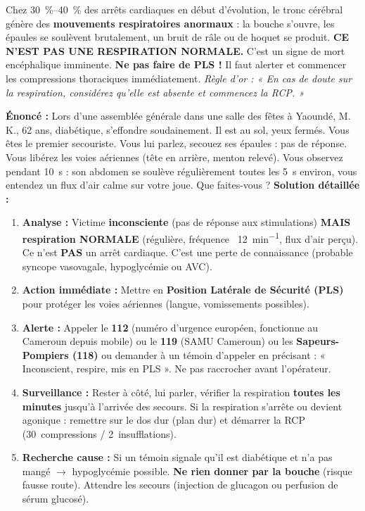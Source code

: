 \documentclass[11pt]{article}
\begin{document}
\begin{attention}
Chez \SIrange{30}{40}{\%} des arrêts cardiaques en début d'évolution, le tronc cérébral génère des \textbf{mouvements respiratoires anormaux} : la bouche s'ouvre, les épaules se soulèvent brutalement, un bruit de râle ou de hoquet se produit. \textbf{CE N'EST PAS UNE RESPIRATION NORMALE.} C'est un signe de mort encéphalique imminente. \textbf{Ne pas faire de PLS !} Il faut alerter et commencer les compressions thoraciques immédiatement. \emph{Règle d'or : « En cas de doute sur la respiration, considérez qu'elle est absente et commencez la RCP. »}
\end{attention}

\begin{exoresolu}
\textbf{Énoncé :} Lors d'une assemblée générale dans une salle des fêtes à Yaoundé, M. K., 62 ans, diabétique, s'effondre soudainement. Il est au sol, yeux fermés. Vous êtes le premier secouriste. Vous lui parlez, secouez ses épaules : pas de réponse. Vous libérez les voies aériennes (tête en arrière, menton relevé). Vous observez pendant \SI{10}{\second} : son abdomen se soulève régulièrement toutes les \SI{5}{\second} environ, vous entendez un flux d'air calme sur votre joue. Que faites-vous ?
\textbf{Solution détaillée :}
\begin{enumerate}
    \item \textbf{Analyse :} Victime \textbf{inconsciente} (pas de réponse aux stimulations) \textbf{MAIS respiration NORMALE} (régulière, fréquence ~\SI{12}{min^{-1}}, flux d'air perçu). Ce n'est \textbf{PAS} un arrêt cardiaque. C'est une perte de connaissance (probable syncope vasovagale, hypoglycémie ou AVC).
    \item \textbf{Action immédiate :} Mettre en \textbf{Position Latérale de Sécurité (PLS)} pour protéger les voies aériennes (langue, vomissements possibles).
    \item \textbf{Alerte :} Appeler le \textbf{112} (numéro d'urgence européen, fonctionne au Cameroun depuis mobile) ou le \textbf{119} (SAMU Cameroun) ou les \textbf{Sapeurs-Pompiers (\SI{118}{})} ou demander à un témoin d'appeler en précisant : « Inconscient, respire, mis en PLS ». Ne pas raccrocher avant l'opérateur.
    \item \textbf{Surveillance :} Rester à côté, lui parler, vérifier la respiration \textbf{toutes les minutes} jusqu'à l'arrivée des secours. Si la respiration s'arrête ou devient agonique : remettre sur le dos dur (plan dur) et démarrer la RCP (\SI{30}{ compressions} / \SI{2}{ insufflations}).
    \item \textbf{Recherche cause :} Si un témoin signale qu'il est diabétique et n'a pas mangé $\rightarrow$ hypoglycémie possible. \textbf{Ne rien donner par la bouche} (risque fausse route). Attendre les secours (injection de glucagon ou perfusion de sérum glucosé).
\end{enumerate}
\end{exoresolu}
\end{document}
